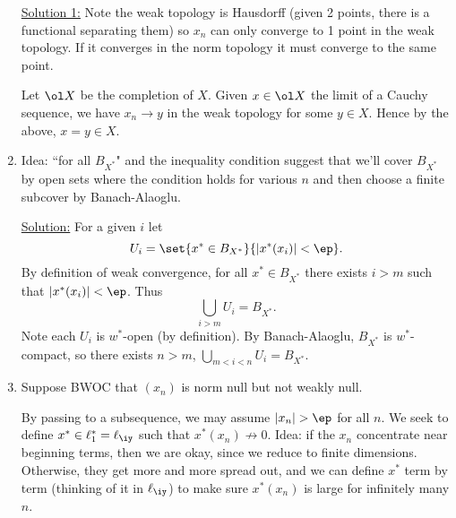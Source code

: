 \begin{enumerate}
\ul{Solution 1:} Note the weak topology is Hausdorff (given 2 points, there is a functional separating them) so $x_n$ can only converge to 1 point in the weak topology. If it converges in the norm topology it must converge to the same point.

Let $\ol X$ be the completion of $X$. Given $x\in \ol X$ the limit of a Cauchy sequence, we have $x_n\to y$ in the weak topology for some $y\in X$. Hence by the above, $x=y\in X$.




\item
Idea: ``for all $B_{X^*}$" and the inequality condition suggest that we'll cover $B_{X^*}$ by open sets where the condition holds for various $n$ and then choose a finite subcover by Banach-Alaoglu.

\ul{Solution:} For a given $i$ let
\[
U_i=\set{x^*\in B_{X^*}}{|x^*(x_i)|<\ep}.
\]
By definition of weak convergence, for all $x^*\in B_{X^*}$ there exists $i>m$ such that $|x^*(x_i)|< \ep$. %
Thus
\[
\bigcup_{i>m}U_i=B_{X^*}.
\]
Note each $U_i$ is $w^*$-open (by definition). By Banach-Alaoglu, $B_{X^*}$ is $w^*$-compact, so there exists $n>m$, $\bigcup_{m<i<n} U_i=B_{X^*}$. %
\item
Suppose BWOC that $(x_n)$ is norm null but not weakly null.  %
%

By passing to a subsequence, we may assume $|x_n|>\ep$ for all $n$. We seek to define $x^*\in \ell_{1}^*=\ell_{\iy}$ such that $x^*(x_n)\not\to 0$. 
Idea: if the $x_n$ concentrate near beginning terms, then we are okay, since we reduce to finite dimensions. Otherwise, they get more and more spread out, and we can define $x^*$ term by term (thinking of it in $\ell_{\iy}$) to make sure $x^*(x_n)$ is large for infinitely many $n$.


\end{enumerate}
